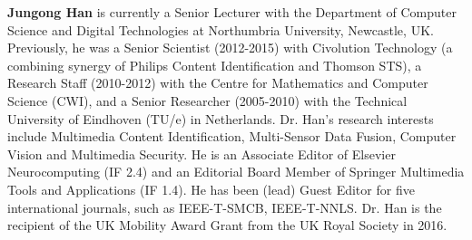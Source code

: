 \documentclass[review]{elsarticle}
\begin{document}
\textbf{Jungong Han}
	is currently a Senior Lecturer with the Department of Computer Science and Digital Technologies at Northumbria University, Newcastle, UK. Previously, he was a Senior Scientist (2012-2015) with Civolution Technology (a combining synergy of Philips Content Identification and Thomson STS), a Research Staff (2010-2012) with the Centre for Mathematics and Computer Science (CWI), and a Senior Researcher (2005-2010) with the Technical University of Eindhoven (TU/e) in Netherlands. Dr. Han’s research interests include Multimedia Content Identification, Multi-Sensor Data Fusion, Computer Vision and Multimedia Security. He is an Associate Editor of Elsevier Neurocomputing (IF 2.4) and an Editorial Board Member of Springer Multimedia Tools and Applications (IF 1.4).  He has been (lead) Guest Editor for five international journals, such as IEEE-T-SMCB, IEEE-T-NNLS. Dr. Han is the recipient of the UK Mobility Award Grant from the UK Royal Society in 2016. \\ \\
\end{document}

